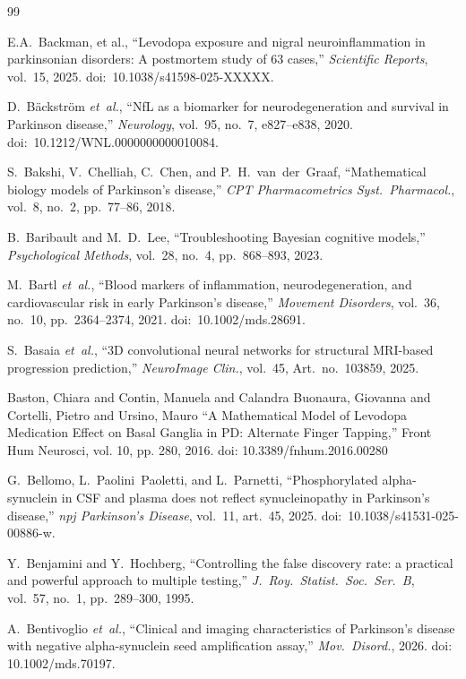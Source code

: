 \begin{thebibliography}{99}

E.A.~Backman, et al., ``Levodopa exposure and nigral neuroinflammation in parkinsonian disorders: A postmortem study of 63 cases,'' \textit{Scientific Reports}, vol.~15, 2025. doi:~10.1038/s41598-025-XXXXX.

D.~B\"{a}ckstr\"{o}m \textit{et~al.}, ``NfL as a biomarker for neurodegeneration and survival in Parkinson disease,'' \textit{Neurology}, vol.~95, no.~7, e827--e838, 2020. doi:~10.1212/WNL.0000000000010084.

S.~Bakshi, V.~Chelliah, C.~Chen, and P.~H.~van~der~Graaf, ``Mathematical biology models of Parkinson's disease,'' \textit{CPT Pharmacometrics Syst.\ Pharmacol.}, vol.~8, no.~2, pp.~77--86, 2018.

B.~Baribault and M.~D.~Lee, ``Troubleshooting Bayesian cognitive models,'' \textit{Psychological Methods}, vol.~28, no.~4, pp.~868--893, 2023.

M.~Bartl \textit{et~al.}, ``Blood markers of inflammation, neurodegeneration, and cardiovascular risk in early Parkinson's disease,'' \textit{Movement Disorders}, vol.~36, no.~10, pp.~2364--2374, 2021. doi:~10.1002/mds.28691.

S.~Basaia \textit{et~al.}, ``3D convolutional neural networks for structural MRI-based progression prediction,'' \textit{NeuroImage Clin.}, vol.~45, Art.\ no.~103859, 2025.

 Baston, Chiara and Contin, Manuela and Calandra Buonaura, Giovanna and Cortelli, Pietro and Ursino, Mauro ``A Mathematical Model of Levodopa Medication Effect on Basal Ganglia in PD: Alternate Finger Tapping,'' Front Hum Neurosci, vol. 10, pp. 280, 2016. doi: 10.3389/fnhum.2016.00280

G.~Bellomo, L.~Paolini~Paoletti, and L.~Parnetti, ``Phosphorylated alpha-synuclein in CSF and plasma does not reflect synucleinopathy in Parkinson's disease,'' \textit{npj Parkinson's Disease}, vol.~11, art.~45, 2025. doi:~10.1038/s41531-025-00886-w.

Y.~Benjamini and Y.~Hochberg, ``Controlling the false discovery rate: a practical and powerful approach to multiple testing,'' \textit{J.~Roy.~Statist.~Soc.~Ser.~B}, vol.~57, no.~1, pp.~289--300, 1995.

A.~Bentivoglio \textit{et~al.}, ``Clinical and imaging characteristics of Parkinson's disease with negative alpha-synuclein seed amplification assay,'' \textit{Mov.\ Disord.}, 2026. doi:\,10.1002/mds.70197.


\end{thebibliography}
